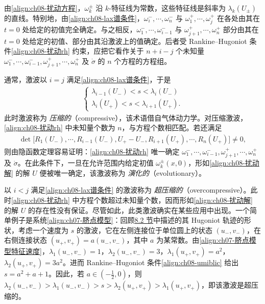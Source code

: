 \documentclass[../../main.tex]{subfiles}
\begin{document}
由\eqref{align:ch08-扰动方程}，$\omega_k^\pm$ 沿 $k$-特征线为常数，这些特征线是斜率为 $\lambda_k(U_\pm)$ 的直线。特别地，由\eqref{align:ch08-lax谱条件}，$\omega_i^-,\cdots,\omega_n^-$ 与 $\omega_1^+,\cdots,\omega_j^+$ 在各处由其在 $t=0$ 处给定的初值完全确定。与之相反，$\omega_1^-,\cdots,\omega_{i-1}^-$ 与 $\omega_{j+1}^+,\cdots,\omega_n^+$ 部分由其在 $t=0$ 处给定的初值、部分由其沿激波上的值确定。后者受 Rankine--Hugoniot 条件\eqref{align:ch08-扰动rh} 约束，应把它看作关于 $n+i-j$ 个未知量 $\omega_1^-,\cdots,\omega_{i-1}^-,\omega_{j+1}^+,\cdots,\omega_n^+$ 及 $\dot\sigma$ 的 $n$ 个方程的方程组。

通常，激波以 $i=j$ 满足\eqref{align:ch08-lax谱条件}，于是
\begin{align}
\begin{cases}
\lambda_{i-1}(U_-)<s<\lambda_i(U_-)\\
\lambda_i(U_+)<s<\lambda_{i+1}(U_+).
\end{cases}
\label{align:ch08-压缩}
\end{align}
此时激波称为 \emph{压缩的}（compressive），该术语借自气体动力学。对压缩激波，\eqref{align:ch08-扰动rh} 中未知量个数为 $n$，与方程个数相匹配。若还满足
\begin{align}
\det\big[R_1(U_-),\cdots,R_{i-1}(U_-),U_+-U_-,R_{i+1}(U_+),\cdots,R_n(U_+)\big]\neq0,
\label{align:ch08-非退化}
\end{align}
则由隐函数定理容易证明：\eqref{align:ch08-扰动rh} 唯一确定 $\omega_1^-,\cdots,\omega_{i-1}^-,\omega_{j+1}^+,\cdots,\omega_n^+$ 及 $\dot\sigma$。在此条件下，一旦在允许范围内给定初值 $\omega_k^\pm(x,0)$，形如\eqref{align:ch08-扰动解} 的解 $U$ 便被唯一确定，该激波称为 \emph{演化的}（evolutionary）。

以 $i<j$ 满足\eqref{align:ch08-lax谱条件} 的激波称为 \emph{超压缩的}（overcompressive）。此时\eqref{align:ch08-扰动rh} 中方程个数超过未知量个数，因而形如\eqref{align:ch08-扰动解} 的解 $U$ 的存在性没有保证。尽管如此，此类激波确实在某些应用中出现。一个简单例子是系统\eqref{align:ch07-脐点模型}：回顾\hyperref[section:ch08-hugoniot轨迹]{8.2 节}中描述的其 Hugoniot 轨迹的形状，考虑一个速度为 $s$ 的激波，它在左侧连接位于单位圆上的状态 $(u_-,v_-)$，在右侧连接状态 $(u_+,v_+)=a(u_-,v_-)$，其中 $a$ 为某常数。由\eqref{align:ch07-脐点模型特征速度}，$\lambda_1(u_-,v_-)=1$，$\lambda_2(u_-,v_-)=3$，$\lambda_1(u_+,v_+)=a^2$，$\lambda_2(u_+,v_+)=3a^2$。进而 Rankine--Hugoniot 条件\eqref{align:ch08-umiblic} 给出 $s=a^2+a+1$。因此，若 $a\in(-\frac12,0)$，则 $\lambda_2(u_-,v_-)>\lambda_1(u_-,v_-)>s>\lambda_2(u_+,v_+)>\lambda_1(u_+,v_+)$，即该激波是超压缩的。
\end{document}
